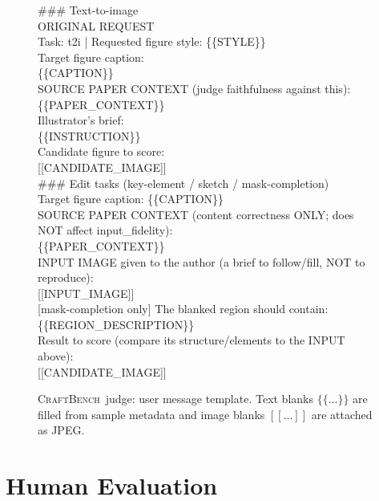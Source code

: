 \documentclass{llmxive}
\providecommand{\CrafterBench}{\textsc{CraftBench}\xspace}
\begin{document}
\begin{figure}[t]
\centering
\begin{tcolorbox}[title={User message (text blanks filled from sample metadata; image blanks attached as JPEG)}, width=\textwidth, colback=gray!5, colframe=black, fonttitle=\bfseries]
\small
\#\#\# Text-to-image \\
ORIGINAL REQUEST \\
Task: t2i  |  Requested figure style: \{\{STYLE\}\} \\
Target figure caption: \\
\{\{CAPTION\}\} \\
SOURCE PAPER CONTEXT (judge faithfulness against this): \\
\{\{PAPER\_CONTEXT\}\} \\
Illustrator's brief: \\
\{\{INSTRUCTION\}\} \\
Candidate figure to score: \\
{}[[CANDIDATE\_IMAGE]] \\[5pt]
\#\#\# Edit tasks (key-element / sketch / mask-completion) \\
Target figure caption: \{\{CAPTION\}\} \\
SOURCE PAPER CONTEXT (content correctness ONLY; does NOT affect input\_fidelity): \\
\{\{PAPER\_CONTEXT\}\} \\
INPUT IMAGE given to the author (a brief to follow/fill, NOT to reproduce): \\
{}[[INPUT\_IMAGE]] \\
{}[mask-completion only] The blanked region should contain: \{\{REGION\_DESCRIPTION\}\} \\
Result to score (compare its structure/elements to the INPUT above): \\
{}[[CANDIDATE\_IMAGE]]
\end{tcolorbox}
\caption{\CrafterBench\ judge: user message template. Text blanks $\{\{\dots\}\}$ are filled from sample metadata and image blanks $[[\dots]]$ are attached as JPEG.}
\label{fig:prompt-judge-user}
\end{figure}

\section{Human Evaluation}
\label{app:human-eval}
\end{document}
